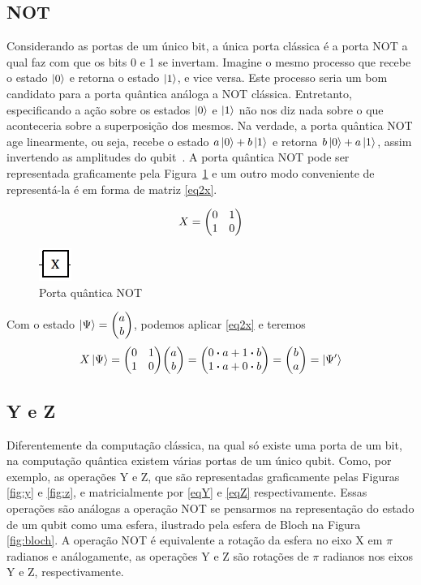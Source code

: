 \documentclass[a4paper, 12pt, oneside]{book}
\begin{document}
\subsection{NOT} 
Considerando as portas de um único bit, a única porta clássica é a porta NOT a qual faz com que os bits 0 e 1 se invertam. Imagine o mesmo processo que recebe o estado $\ket{0}$ e retorna o estado $\ket{1}$, e vice versa. Este processo seria um bom candidato para a porta quântica análoga a NOT clássica. Entretanto, especificando a ação sobre os estados $\ket{0}$ e $\ket{1}$ não nos diz nada sobre o que aconteceria sobre a superposição dos mesmos. Na verdade, a porta quântica NOT age linearmente, ou seja, recebe o estado $a\ket{0} + b\ket{1}$ e retorna $b\ket{0} + a\ket{1}$, assim invertendo as amplitudes do qubit~\cite{nielsen}. A porta quântica NOT pode ser representada graficamente pela Figura~\ref{fig:not} e um outro modo conveniente de representá-la é em forma de matriz \eqref{eq2x}.

\begin{equation}\label{eq2x}
X =  \mqty(0&1\\1&0)
\end{equation}

\begin{figure}[H]
\centering
\includegraphics[scale=0.75]{x.jpg}
\caption{Porta quântica NOT}
\label{fig:not}
\end{figure}

Com o estado $\ket{\Psi} = \mqty(a\\b)$, podemos aplicar \eqref{eq2x} e teremos
\begin{align*}
X\ket{\Psi} = \mqty(0&1\\1&0)\mqty(a\\b) = \mqty(0 \vdot a+1 \vdot b \\1 \vdot a+0 \vdot b) = \mqty(b\\a) = \ket{\Psi'}
\end{align*}

\subsection{Y e Z} 
Diferentemente da computação clássica, na qual só existe uma porta de um bit, na computação quântica existem várias portas de um único qubit. Como, por exemplo, as operações Y e Z, que são representadas graficamente pelas Figuras \ref{fig:y} e \ref{fig:z}, e matricialmente por \eqref{eqY} e \eqref{eqZ} respectivamente. Essas operações são análogas a operação NOT se pensarmos na representação do estado de um qubit como uma esfera, ilustrado pela esfera de Bloch na Figura \ref{fig:bloch}. A operação NOT é equivalente a rotação da esfera no eixo X em $\pi$ radianos e análogamente, as operações Y e Z são rotações de $\pi$ radianos nos eixos Y e Z, respectivamente.
\end{document}
